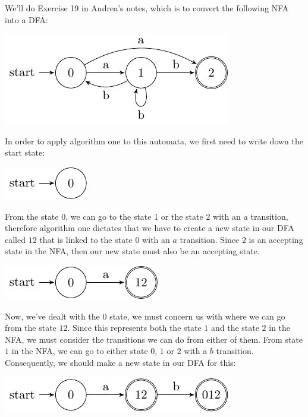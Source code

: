 We'll do Exercise 19 in Andrea's notes, which is to convert the following NFA
into a DFA:

\begin{center}
  \includegraphics{automata/5.pdf}
\end{center}

In order to apply algorithm one to this automata, we first need to write down
the start state:

\begin{center}
  \includegraphics{automata/6.pdf}
\end{center}

From the state $0$, we can go to the state $1$ or the state $2$ with an $a$
transition, therefore algorithm one dictates that we have to create a new state
in our DFA called $12$ that is linked to the state $0$ with an $a$ transition.
Since $2$ is an accepting state in the NFA, then our new state must also be an
accepting state.

\begin{center}
  \includegraphics{automata/7.pdf}
\end{center}

Now, we've dealt with the $0$ state, we must concern us with where we can go
from the state $12$. Since this represents both the state $1$ and the state $2$
in the NFA, we must consider the transitions we can do from either of them. From
state $1$ in the NFA, we can go to either state $0$, $1$ or $2$ with a $b$
transition. Consequently, we should make a new state in our DFA for this:

\begin{center}
  \includegraphics{automata/8.pdf}
\end{center}

